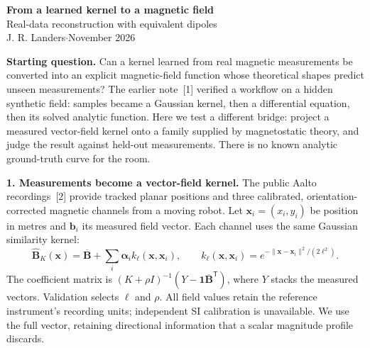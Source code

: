 \documentclass[11pt,letterpaper]{article}
\begin{document}
\begin{center}
{\Large\bfseries From a learned kernel to a magnetic field}\\[3pt]
{\large Real-data reconstruction with equivalent dipoles}\\[3pt]
{\small J. R. Landers\quad$\cdot$\quad November 2026}
\end{center}
\vspace{-6pt}

\textbf{Starting question.}
Can a kernel learned from real magnetic measurements be converted into an explicit
magnetic-field function whose theoretical shapes predict unseen measurements?
The earlier note~[1] verified a workflow on a hidden synthetic field: samples
became a Gaussian kernel, then a differential equation, then its solved analytic
function. Here we test a different bridge: project a measured vector-field kernel
onto a family supplied by magnetostatic theory, and judge the result against
held-out measurements. There is no known analytic ground-truth curve for the room.

\textbf{1. Measurements become a vector-field kernel.}
The public Aalto recordings~[2] provide tracked planar positions and three
calibrated, orientation-corrected magnetic channels from a moving robot.
Let $\mathbf x_i=(x_i,y_i)$ be position in metres and $\mathbf b_i$ its measured
field vector. Each channel uses the same Gaussian similarity kernel:
\begin{equation}
\widehat{\mathbf B}_K(\mathbf x)=\overline{\mathbf B}
+\sum_i\boldsymbol\alpha_i k_\ell(\mathbf x,\mathbf x_i),\qquad
k_\ell(\mathbf x,\mathbf x_i)=
e^{-\|\mathbf x-\mathbf x_i\|^2/(2\ell^2)}.
\label{eq:kernel}
\end{equation}
The coefficient matrix is $(K+\rho I)^{-1}(Y-\mathbf1\overline{\mathbf B}^{\mathsf T})$,
where $Y$ stacks the measured vectors. Validation selects $\ell$ and $\rho$.
All field values retain the reference instrument's recording units; independent
SI calibration is unavailable. We use the full vector, retaining directional
information that a scalar magnitude profile discards.
\end{document}
